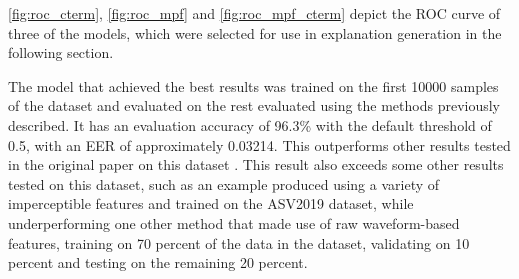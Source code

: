\documentclass{article}
\begin{document}
		\ref{fig:roc_cterm}, \ref{fig:roc_mpf} and \ref{fig:roc_mpf_cterm} depict the ROC curve of
		three of the models, which were selected for use in explanation generation in the
		following section.
		\par
		The model that achieved the best results was trained on the first
		10000 samples of the dataset and evaluated on the rest evaluated using the methods
		previously described. It has an evaluation accuracy of 96.3\% with the default threshold
		of 0.5, with an EER of approximately 0.03214. This outperforms other results tested in the
		original paper on this dataset \cite{muller_does_2022}. This result also exceeds some
		other results tested on this dataset, such as an example \cite{yang_robust_2024} produced
		using a variety of imperceptible features and trained on the ASV2019 dataset, while
		underperforming one other method \cite{ranjan_statnet_2022} that made use of raw
		waveform-based features, training on 70 percent of the data in the dataset, validating on
		10 percent and testing on the remaining 20 percent.
\end{document}
